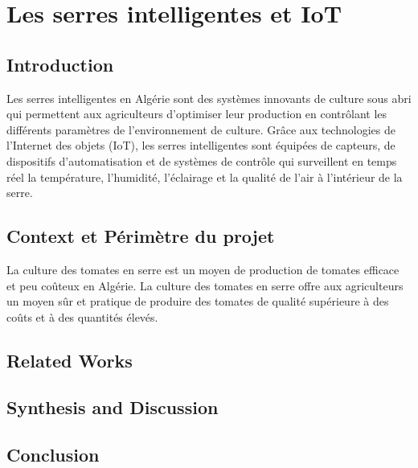 \chapter{Les serres intelligentes et IoT} \label{chap:serres_intelligent_iot}

\section*{Introduction}
Les serres intelligentes en Algérie sont des systèmes innovants de culture sous abri qui permettent aux agriculteurs d'optimiser leur production en contrôlant les différents paramètres de l'environnement de culture. Grâce aux technologies de l'Internet des objets (IoT), les serres intelligentes sont équipées de capteurs, de dispositifs d'automatisation et de systèmes de contrôle qui surveillent en temps réel la température, l'humidité, l'éclairage et la qualité de l'air à l'intérieur de la serre.
\\
\section{Context et Périmètre du projet}
La culture des tomates en serre est un moyen de production de tomates efficace et peu coûteux en Algérie. La culture des tomates en serre offre aux agriculteurs un moyen sûr et pratique de produire des tomates de qualité supérieure à des coûts et à des quantités élevés.

\section{Related Works}
\section{Synthesis and Discussion}
\section*{Conclusion}
